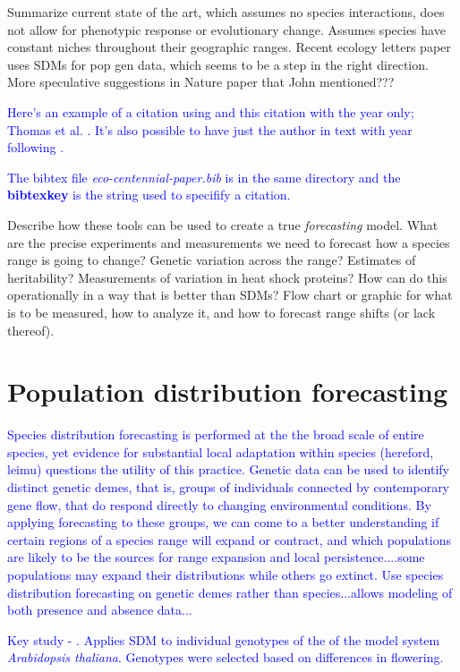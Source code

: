 \documentclass{article}
\newcommand{\Jtxt}[1]{\textcolor{blue}{#1}}
\begin{document}
Summarize current state of the art, which assumes no species interactions, does not allow for phenotypic response or evolutionary change. Assumes species have constant niches throughout their geographic ranges. Recent ecology letters paper uses SDMs for pop gen data, which seems to be a step in the right direction. More speculative suggestions in Nature paper that John mentioned???

\Jtxt{Here's an example of a citation using \parencite{ettinger2013} and this citation with the year only; Thomas et al. \parencite*{thomas2004}. It's also possible to have just the author in text with year following   \textcite{aitken2013}. }

 \Jtxt{The bibtex file \emph{eco-centennial-paper.bib} is in the same directory and the \textbf{bibtexkey} is the string used to specifify a citation.}


Describe how these tools can be used to create a true \emph{forecasting} model. What are the precise experiments and measurements we need to forecast how a species range is going to change? Genetic variation across the range? Estimates of heritability? Measurements of variation in heat shock proteins? How can do this operationally in a way that is better than SDMs? Flow chart or graphic for what is to be measured, how to analyze it, and how to forecast range shifts (or lack thereof).	

\section*{Population distribution forecasting}

\Jtxt{Species distribution forecasting is performed at the the broad scale of entire species, yet evidence for substantial local adaptation within species (hereford, leimu) questions the utility of this practice. Genetic data can be used to identify distinct genetic demes, that is, groups of individuals connected by contemporary gene flow, that do respond directly to changing environmental conditions. By applying forecasting to these groups, we can come to a better understanding if certain regions of a species range will expand or contract, and which populations are likely to be the sources for range expansion and local persistence....some populations may expand their distributions while others go extinct. Use species distribution forecasting on genetic demes rather than species...allows modeling of both presence and absence data...}

\Jtxt{Key study - \textcite{banta2012}. Applies SDM to individual genotypes of the of the model system \emph{Arabidopsis thaliana}. Genotypes were selected based on differences in flowering.  }
\end{document}
